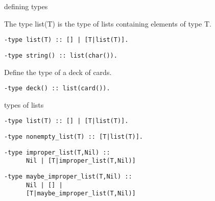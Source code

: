 \begin{frame}[fragile]{defining types}

The type list(T) is the type of lists containing elements of type T.
\pause

\begin{verbatim}
-type list(T) :: [] | [T|list(T)].
\end{verbatim}

\pause
\begin{verbatim}
-type string() :: list(char()).
\end{verbatim}

Define the type of a deck of cards.
\pause
\begin{verbatim}
-type deck() :: list(card()).
\end{verbatim}

\end{frame}

\begin{frame}[fragile]{types of lists}

\begin{verbatim}
-type list(T) :: [] | [T|list(T)].
\end{verbatim}

\begin{verbatim}
-type nonempty_list(T) :: [T|list(T)].
\end{verbatim}

\begin{verbatim}
-type improper_list(T,Nil) :: 
      Nil | [T|improper_list(T,Nil)]
\end{verbatim}

\begin{verbatim}
-type maybe_improper_list(T,Nil) :: 
      Nil | [] | 
      [T|maybe_improper_list(T,Nil)]
\end{verbatim}

\end{frame}


